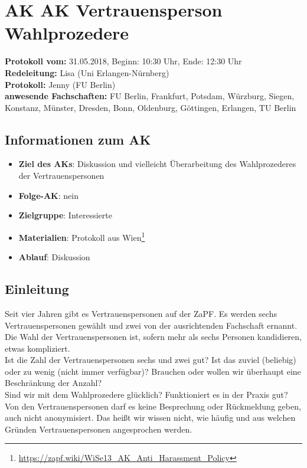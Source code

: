 
\section{AK AK Vertrauensperson Wahlprozedere}

  \textbf{Protokoll vom:} 31.05.2018, %
  Beginn: 10:30 Uhr, %
  Ende: 12:30 Uhr \\ %
  \textbf{Redeleitung:} Lisa (Uni Erlangen-Nürnberg) \\
  \textbf{Protokoll:} Jenny (FU Berlin) \\
  \textbf{anwesende Fachschaften:} FU Berlin, Frankfurt, Potsdam, Würzburg, Siegen, Konstanz, Münster, Dresden, Bonn, Oldenburg, Göttingen, Erlangen, TU Berlin

  \subsection*{Informationen zum AK}
    \begin{itemize}
      \item \textbf{Ziel des AKs}: Diskussion und vielleicht Überarbeitung des Wahlprozederes der Vertrauenspersonen
      \item \textbf{Folge-AK}: nein
      \item \textbf{Zielgruppe}: Interessierte
      \item \textbf{Materialien}: Protokoll aus Wien\footnote{\url{https://zapf.wiki/WiSe13_AK_Anti_Harassment_Policy}}
      \item \textbf{Ablauf}: Diskussion
    \end{itemize}

  \subsection*{Einleitung}
    Seit vier Jahren gibt es Vertrauenspersonen auf der ZaPF. Es werden sechs Vertrauenspersonen gewählt und zwei von der ausrichtenden Fachschaft ernannt. Die Wahl der Vertrauenspersonen ist, sofern mehr als sechs Personen kandidieren, etwas kompliziert. \\

    Ist die Zahl der Vertrauenspersonen sechs und zwei gut? Ist das zuviel (beliebig) oder zu wenig (nicht immer verfügbar)? Brauchen oder wollen wir überhaupt eine Beschränkung der Anzahl? \\
    Sind wir mit dem Wahlprozedere glücklich? Funktioniert es in der Praxis gut? \\
    Von den Vertrauenspersonen darf es keine Besprechung oder Rückmeldung geben, auch nicht anonymisiert. Das heißt wir wissen nicht, wie häufig und aus welchen Gründen Vertrauenspersonen angesprochen werden. \\

